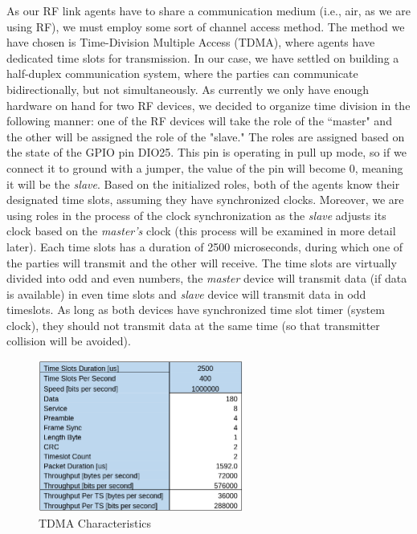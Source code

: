As our RF link agents have to share a communication medium (i.e., air, as we are using RF), we must employ some sort of channel access method. The method we have chosen is Time-Division Multiple Access (TDMA), where agents have dedicated time slots for transmission. In our case, we have settled on building a half-duplex communication system, where the parties can communicate bidirectionally, but not simultaneously. As currently we only have enough hardware on hand for two RF devices, we decided to organize time division in the following manner: one of the RF devices will take the role of the “master" and the other will be assigned the role of the "slave." 
The roles are assigned based on the state of the GPIO pin DIO25. This pin is operating in pull up mode, so if we connect it to ground with a jumper, the value of the pin will become 0, meaning it will be the \emph{slave}.
Based on the initialized roles, both of the agents know their designated time slots, assuming they have synchronized clocks. Moreover, we are using roles in the process of the clock synchronization as the \emph{slave} adjusts its clock based on the \emph{master’s} clock (this process will be examined in more detail later). Each time slots has a duration of 2500 microseconds, during which one of the parties will transmit and the other will receive. The time slots are virtually divided into odd and even numbers, the \emph{master} device will transmit data (if data is available) in even time slots and \emph{slave} device will transmit data in odd timeslots. As long as both devices have synchronized time slot timer (system clock), they should not transmit data at the same time (so that transmitter collision will be avoided).
\begin{figure}[H]
\begin{center}
\includegraphics[width=0.60\textwidth]{TDMA}
\end{center}
\caption{TDMA Characteristics}
\label{tdma-chrac}
\end{figure}

